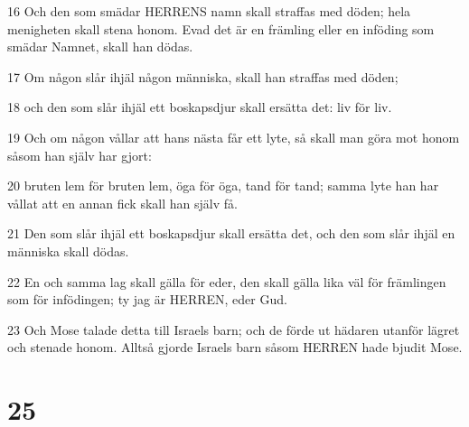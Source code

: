 \par 16 Och den som smädar HERRENS namn skall straffas med döden; hela menigheten skall stena honom. Evad det är en främling eller en inföding som smädar Namnet, skall han dödas.
\par 17 Om någon slår ihjäl någon människa, skall han straffas med döden;
\par 18 och den som slår ihjäl ett boskapsdjur skall ersätta det: liv för liv.
\par 19 Och om någon vållar att hans nästa får ett lyte, så skall man göra mot honom såsom han själv har gjort:
\par 20 bruten lem för bruten lem, öga för öga, tand för tand; samma lyte han har vållat att en annan fick skall han själv få.
\par 21 Den som slår ihjäl ett boskapsdjur skall ersätta det, och den som slår ihjäl en människa skall dödas.
\par 22 En och samma lag skall gälla för eder, den skall gälla lika väl för främlingen som för infödingen; ty jag är HERREN, eder Gud.
\par 23 Och Mose talade detta till Israels barn; och de förde ut hädaren utanför lägret och stenade honom. Alltså gjorde Israels barn såsom HERREN hade bjudit Mose.

\chapter{25}


